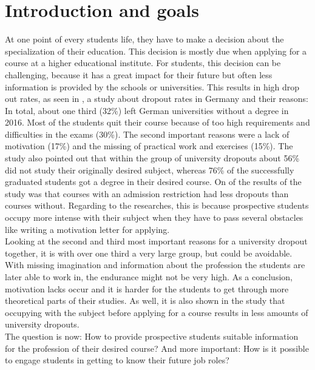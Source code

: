 \chapter{Introduction and goals}
At one point of every students life, they have to make a decision about the specialization of their education. This decision is mostly due when applying for a course at a higher educational institute. For students, this decision can be challenging, because it has a great impact for their future but often less information is provided by the schools or universities. This results in high drop out rates, as seen in \cite{UlrichHeublein.Juni2017}, a study about dropout rates in Germany and their reasons: \\ In total, about one third (32\%) left German universities without a degree in 2016. Most of the students quit their course because of too high requirements and difficulties in the exams (30\%). The second important reasons were a lack of motivation (17\%) and the missing of practical work and exercises (15\%). The study also pointed out that within the group of university dropouts about 56\% did not study their originally desired subject, whereas 76\% of the successfully graduated students got a degree in their desired course. On of the results of the study was that courses with an admission restriction had less dropouts than courses without. Regarding to the researches, this is because prospective students occupy more intense with their subject when they have to pass several obstacles like writing a motivation letter for applying. \\
Looking at the second and third most important reasons for a university dropout together, it is with over one third a very large group, but could be avoidable. With missing imagination and information about the profession the students are later able to work in, the endurance might not be very high. As a conclusion, motivation lacks occur and it is harder for the students to get through more theoretical parts of their studies. As well, it is also shown in the study that occupying with the subject before applying for a course results in less amounts of university dropouts. \\
The question is now: How to provide prospective students suitable information for the profession of their desired course? And more important: How is it possible to engage students in getting to know their future job roles?

